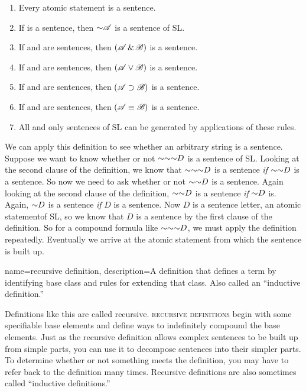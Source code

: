 \begin{enumerate}
\item Every atomic statement is a sentence.
\item If  is a sentence, then $\mathord{\sim}\mathscr{A}$ is a sentence of SL.
\item If  and  are sentences, then $(\mathscr{A}\,\&\,\mathscr{B})$ is a sentence.
\item If  and  are sentences, then $(\mathscr{A}\vee\mathscr{B})$ is a sentence.
\item If  and  are sentences, then $(\mathscr{A}\supset\mathscr{B})$ is a sentence.
\item If  and  are sentences, then $(\mathscr{A}\equiv\mathscr{B})$ is a sentence.
\item All and only sentences of SL can be generated by applications of these rules.
\end{enumerate}

We can apply this definition to see whether an arbitrary string is a sentence. Suppose we want to know whether or not $\mathord{\sim} \mathord{\sim} \mathord{\sim} D$ is a sentence of SL. Looking at the second clause of the definition, we know that $\mathord{\sim} \mathord{\sim} \mathord{\sim} D$ is a sentence \emph{if} $\mathord{\sim} \mathord{\sim} D$ is a sentence. So now we need to ask whether or not $\mathord{\sim} \mathord{\sim} D$ is a sentence. Again looking at the second clause of the definition, $\mathord{\sim} \mathord{\sim} D$ is a sentence \emph{if} $\mathord{\sim} D$ is. Again, $\mathord{\sim} D$ is a sentence \emph{if} $D$ is a sentence. Now $D$ is a sentence letter, an atomic statementof SL, so we know that $D$ is a sentence by the first clause of the definition. So for a compound formula like $\mathord{\sim} \mathord{\sim} \mathord{\sim} D$, we must apply the definition repeatedly. Eventually we arrive at the atomic statement from which the sentence is built up.

{
name=recursive definition,
description={A definition that defines a term by identifying base class and rules for extending that class. Also called an ``inductive definition.''}
}

Definitions like this are called recursive. \textsc{\Glspl{recursive definition}}\label{def:recursive_definition} begin with some specifiable base elements and define ways to indefinitely compound the base elements. Just as the recursive definition allows complex sentences to be built up from simple parts, you can use it to decompose sentences into their simpler parts. To determine whether or not something meets the definition, you may have to refer back to the definition many times. Recursive definitions are also sometimes called ``inductive definitions.''


